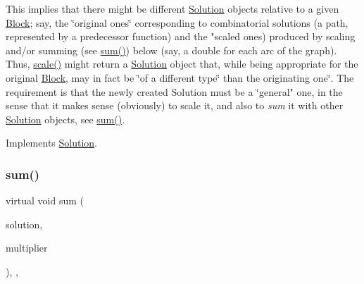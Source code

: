 This implies that there might be different \mbox{\hyperlink{class_s_m_spp__di__unipi__it_1_1_solution}{Solution}} objects relative to a given \mbox{\hyperlink{class_s_m_spp__di__unipi__it_1_1_block}{Block}}; say, the \char`\"{}original ones\char`\"{} corresponding to combinatorial solutions (a path, represented by a predecessor function) and the "scaled ones) produced by scaling and/or summing (see \mbox{\hyperlink{class_s_m_spp__di__unipi__it_1_1_m_c_f_solution_ac91491316467fa9925f2c8e8fc08f4c1}{sum()}}) below (say, a double for each arc of the graph). Thus, \mbox{\hyperlink{class_s_m_spp__di__unipi__it_1_1_m_c_f_solution_a2c818cbb6d8b22f839a7f7336f6b382b}{scale()}} might return a \mbox{\hyperlink{class_s_m_spp__di__unipi__it_1_1_solution}{Solution}} object that, while being appropriate for the original \mbox{\hyperlink{class_s_m_spp__di__unipi__it_1_1_block}{Block}}, may in fact be \char`\"{}of
a different type\char`\"{} than the originating one\char`\"{}. The requirement is that the
newly created Solution must be a \char`\"{}general" one, in the sense that it makes sense (obviously) to scale it, and also to {\itshape sum} it with other \mbox{\hyperlink{class_s_m_spp__di__unipi__it_1_1_solution}{Solution}} objects, see \mbox{\hyperlink{class_s_m_spp__di__unipi__it_1_1_m_c_f_solution_ac91491316467fa9925f2c8e8fc08f4c1}{sum()}}. 

Implements \mbox{\hyperlink{class_s_m_spp__di__unipi__it_1_1_solution_abf1a2d1763f128a72b2677d4b9ff4d3b}{Solution}}.

\mbox{\label{class_s_m_spp__di__unipi__it_1_1_m_c_f_solution_ac91491316467fa9925f2c8e8fc08f4c1}} 
\subsubsection{\texorpdfstring{sum()}{sum()}}
{\footnotesize\ttfamily virtual void sum (\begin{DoxyParamCaption}\item[{const \mbox{\hyperlink{class_s_m_spp__di__unipi__it_1_1_solution}{Solution}} $\ast$}]{solution,  }\item[{double}]{multiplier }\end{DoxyParamCaption})\hspace{0.3cm}{\ttfamily [final]}, {\ttfamily [override]}, {\ttfamily [virtual]}}



